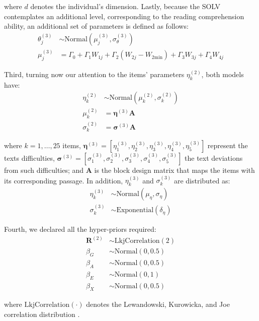 where $d$ denotes the individual's dimension. Lastly, because the SOLV contemplates an additional level, corresponding to the reading comprehension ability, an additional set of parameters is defined as follows:
%
\begin{align}
	\theta^{(3)}_{j} &\sim \text{Normal} \left( \mu^{(3)}_{j}, \sigma^{(3)}_{\theta} \right) \\
	\mu^{(3)}_{j} &=  \Gamma_{0} + \Gamma_{1} W_{1j} + \Gamma_{2} (W_{2j} - W_{2\text{min}}) + \Gamma_{3} W_{3j} + \Gamma_{4} W_{4j}
\end{align}

Third, turning now our attention to the items' parameters $\eta^{(2)}_{k}$, both models have:
%
\begin{align}
	\eta^{(2)}_{k} &\sim \text{Normal} \left( \mu^{(2)}_{k}, \sigma^{(2)}_{k} \right) \\
	\mu^{(2)}_{k} &= \pmb{\eta}^{(3)} \mathbf{A} \\
	\sigma^{(2)}_{k} &= \pmb{\sigma}^{(3)} \mathbf{A}
\end{align}

where $k=1, \dots, 25$ items, $\pmb{\eta}^{(3)} = [ \eta^{(3)}_{1}, \eta^{(3)}_{2}, \eta^{(3)}_{3}, \eta^{(3)}_{4}, \eta^{(3)}_{5} ]$ represent the texts difficulties, $\pmb{\sigma}^{(3)} = [ \sigma^{(3)}_{1}, \sigma^{(3)}_{2}, \sigma^{(3)}_{3}, \sigma^{(3)}_{4}, \sigma^{(3)}_{5} ]$ the text deviations from such difficulties; and $\mathbf{A}$ is the block design matrix that maps the items with its corresponding passage. In addition, $\eta^{(3)}_{k}$ and $\sigma^{(3)}_{k}$ are distributed as:
%
\begin{align}
	\eta^{(3)}_{k} &\sim \text{Normal} \left( \mu_{\eta}, \sigma_{\eta} \right) \\
	\sigma^{(3)}_{k} &\sim \text{Exponential} \left( \delta_{\eta} \right)
\end{align}

Fourth, we declared all the hyper-priors required:
%
\begin{align}
	\boldsymbol{R}^{(2)} &\sim \text{LkjCorrelation}( 2 ) \\
	\beta_{G} &\sim \text{Normal}( 0, 0.5 ) \\
	\beta_{A} &\sim \text{Normal}( 0, 0.5 ) \\
	\beta_{E} &\sim \text{Normal}( 0, 1 ) \\
	\beta_{X} &\sim \text{Normal}( 0, 0.5 ) 
\end{align}

\noindent where $\text{LkjCorrelation}(\cdot)$ denotes the Lewandowski, Kurowicka, and Joe correlation distribution \cite{Lewandowski_et_al_2009}. 

